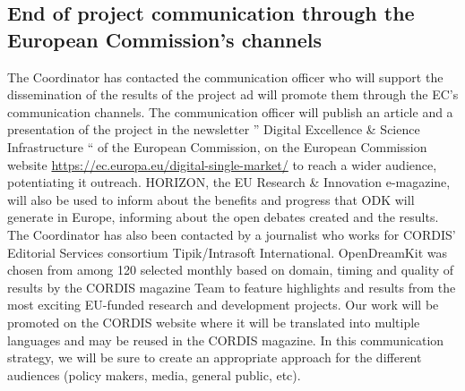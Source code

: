 \documentclass{deliverablereport}
\begin{document}


\subsection{End of project communication through the European Commission's channels}

The Coordinator has contacted the communication officer  who will support the dissemination
of the results of the project ad will promote them through the EC's communication channels. 
The communication officer will publish an article and a presentation of the project in the 
newsletter ” Digital Excellence \& Science Infrastructure “ of the European Commission, 
on the European Commission website \url{https://ec.europa.eu/digital-single-market/} to reach 
a wider audience, potentiating it outreach. 
HORIZON, the EU Research \& Innovation e-magazine, will also be used to inform about 
the benefits and progress that ODK will generate in Europe, informing about 
the open debates created and the results.
The Coordinator has also been contacted by a journalist who works for CORDIS' Editorial
 Services consortium Tipik/Intrasoft International. OpenDreamKit was chosen from among 120
selected monthly based on domain, timing and quality of results by the CORDIS magazine Team
to feature highlights and results from the most exciting EU-funded research and development projects.
Our work will be promoted on the CORDIS website where it will be translated into multiple
languages and may be reused in the CORDIS magazine. In this communication strategy, we will
be sure to create an appropriate approach for the different audiences (policy makers, media,
general public, etc).
\clearpage
\appendix

\clearpage

\end{document}
